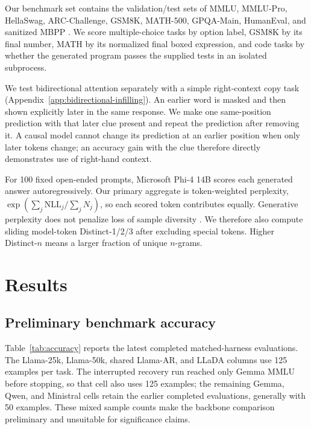 \documentclass{article}
\begin{document}
Our benchmark set contains the validation/test sets of MMLU, MMLU-Pro, HellaSwag, ARC-Challenge, GSM8K, MATH-500, GPQA-Main, HumanEval, and sanitized MBPP \citep{hendrycks2021mmlu,wang2024mmlupro,zellers2019hellaswag,clark2018arc,cobbe2021gsm8k,hendrycks2021math,rein2023gpqa,chen2021codex,austin2021mbpp}. We score multiple-choice tasks by option label, GSM8K by its final number, MATH by its normalized final boxed expression, and code tasks by whether the generated program passes the supplied tests in an isolated subprocess.

We test bidirectional attention separately with a simple right-context copy task (Appendix~\ref{app:bidirectional-infilling}). An earlier word is masked and then shown explicitly later in the same response. We make one same-position prediction with that later clue present and repeat the prediction after removing it. A causal model cannot change its prediction at an earlier position when only later tokens change; an accuracy gain with the clue therefore directly demonstrates use of right-hand context.

For 100 fixed open-ended prompts, Microsoft Phi-4 14B scores each generated answer autoregressively. Our primary aggregate is token-weighted perplexity, $\exp(\sum_j \mathrm{NLL}_j/\sum_j N_j)$, so each scored token contributes equally. Generative perplexity does not penalize loss of sample diversity \citep{turok2026duel}. We therefore also compute sliding model-token Distinct-1/2/3 after excluding special tokens. Higher Distinct-$n$ means a larger fraction of unique $n$-grams.

\section{Results}

\subsection{Preliminary benchmark accuracy}

Table~\ref{tab:accuracy} reports the latest completed matched-harness evaluations. The Llama-25k, Llama-50k, shared Llama-AR, and LLaDA columns use 125 examples per task. The interrupted recovery run reached only Gemma MMLU before stopping, so that cell also uses 125 examples; the remaining Gemma, Qwen, and Ministral cells retain the earlier completed evaluations, generally with 50 examples. These mixed sample counts make the backbone comparison preliminary and unsuitable for significance claims.
\end{document}
